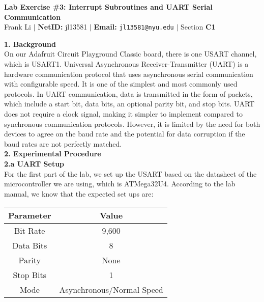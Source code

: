 \documentclass{report}
\begin{document}
\begin{center}
    \textbf{\huge Lab Exercise \#3: Interrupt Subroutines and UART Serial Communication} \\[1em]
    Frank Li $|$
    \textbf{NetID:} jl13581 $|$
    \textbf{Email:} \texttt{jl13581@nyu.edu} $|$
    Section \textbf{C1} \\ [1em]
\end{center}
    {\Large \textbf{1. Background}}\\[0.5em]
    On our Adafruit Circuit Playground Classic board, there is one USART channel, which is USART1. Universal Asynchronous Receiver-Transmitter (UART) is a hardware communication protocol that uses asynchronous serial communication with configurable speed. It is one of the simplest and most commonly used protocols. In UART communication, data is transmitted in the form of packets, which include a start bit, data bits, an optional parity bit, and stop bits. UART does not require a clock signal, making it simpler to implement compared to synchronous communication protocols. However, it is limited by the need for both devices to agree on the baud rate and the potential for data corruption if the baud rates are not perfectly matched.\\[1em]
    {\Large \textbf{2. Experimental Procedure}}\\[0.5em]
    {\Large \textbf{2.a UART Setup}}\\[0.5em]
    For the first part of the lab, we set up the USART based on the datasheet of the microcontroller we are using, which is ATMega32U4. According to the lab manual, we know that the expected set ups are:
    \begin{center}
        \begin{tabular}{|c|c|}
        \hline
        \textbf{Parameter} & \textbf{Value} \\
        \hline
        Bit Rate & 9,600 \\
        \hline
        Data Bits & 8 \\
        \hline
        Parity & None \\
        \hline
        Stop Bits & 1 \\
        \hline
        Mode & Asynchronous/Normal Speed \\
        \hline
        \end{tabular}
\end{center}
\end{document}
